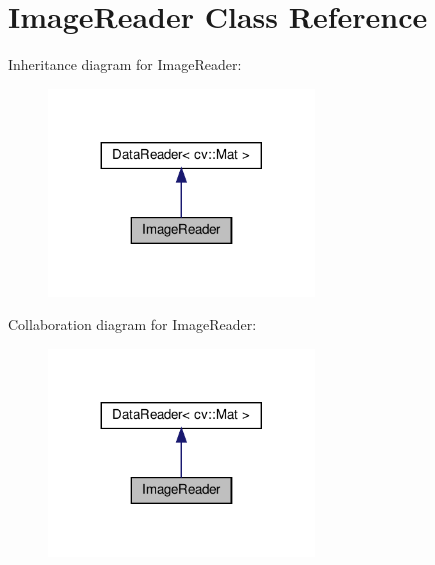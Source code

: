 \hypertarget{classImageReader}{}\section{Image\+Reader Class Reference}
\label{classImageReader}


Inheritance diagram for Image\+Reader\+:\nopagebreak
\begin{figure}[H]
\begin{center}
\leavevmode
\includegraphics[width=200pt]{classImageReader__inherit__graph}
\end{center}
\end{figure}


Collaboration diagram for Image\+Reader\+:\nopagebreak
\begin{figure}[H]
\begin{center}
\leavevmode
\includegraphics[width=200pt]{classImageReader__coll__graph}
\end{center}
\end{figure}
